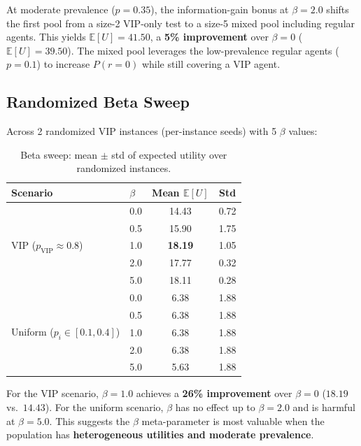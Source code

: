 \documentclass[11pt,a4paper]{article}
\newcommand{\E}{\mathbb{E}}
\begin{document}
\begin{finding}
At moderate prevalence ($p=0.35$), the information-gain bonus at $\beta=2.0$ shifts the first pool from a size-2 VIP-only test to a size-5 mixed pool including regular agents.
This yields $\E[U] = 41.50$, a \textbf{5\% improvement} over $\beta=0$ ($\E[U]=39.50$).
The mixed pool leverages the low-prevalence regular agents ($p=0.1$) to increase $P(r{=}0)$ while still covering a VIP agent.
\end{finding}


\subsection{Randomized Beta Sweep}

Across 2 randomized VIP instances (per-instance seeds) with 5 $\beta$ values:

\begin{table}[h]
\centering
\caption{Beta sweep: mean $\pm$ std of expected utility over randomized instances.}
\label{tab:beta_sweep}
\begin{tabular}{llcc}
\toprule
\textbf{Scenario} & $\beta$ & Mean $\E[U]$ & Std \\
\midrule
\multirow{5}{*}{VIP ($p_{\text{VIP}}\approx0.8$)}
 & 0.0 & 14.43 & 0.72 \\
 & 0.5 & 15.90 & 1.75 \\
 & 1.0 & \textbf{18.19} & 1.05 \\
 & 2.0 & 17.77 & 0.32 \\
 & 5.0 & 18.11 & 0.28 \\
\midrule
\multirow{5}{*}{Uniform ($p_i \in [0.1,0.4]$)}
 & 0.0 & 6.38 & 1.88 \\
 & 0.5 & 6.38 & 1.88 \\
 & 1.0 & 6.38 & 1.88 \\
 & 2.0 & 6.38 & 1.88 \\
 & 5.0 & 5.63 & 1.88 \\
\bottomrule
\end{tabular}
\end{table}

\begin{finding}
For the VIP scenario, $\beta = 1.0$ achieves a \textbf{26\% improvement} over $\beta=0$ ($18.19$ vs.\ $14.43$).
For the uniform scenario, $\beta$ has no effect up to $\beta=2.0$ and is harmful at $\beta=5.0$.
This suggests the $\beta$ meta-parameter is most valuable when the population has \textbf{heterogeneous utilities and moderate prevalence}.
\end{finding}
\end{document}
